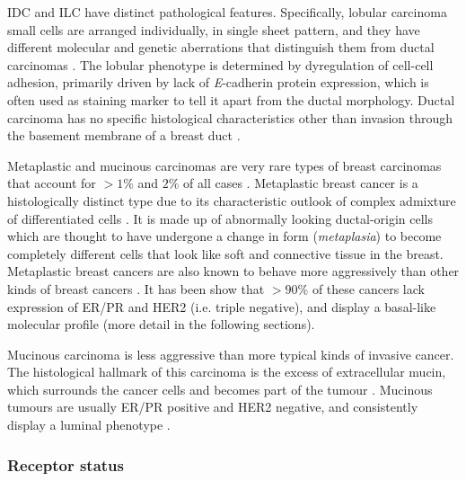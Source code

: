   IDC and ILC have distinct pathological features. Specifically, lobular carcinoma small cells are arranged individually, in single sheet pattern, and they have different molecular and genetic aberrations that distinguish them from ductal carcinomas \cite{weigelt2010molecular}. The lobular phenotype is determined by dyregulation of cell-cell adhesion, primarily driven by lack of \textit{E}-cadherin protein expression, which is often used as staining marker to tell it apart from the ductal morphology\cite{Ciriello2015ComprehensiveCancer, Abdelmessieh2016BreastOverview}. Ductal carcinoma has no specific histological characteristics other than invasion through the basement membrane of a breast duct \cite{Weigelt2008RefinementTypes}. 
   
    Metaplastic and mucinous carcinomas are very rare types of breast carcinomas that account for $>1\%$ and $2\%$ of all cases  \cite{Makki2015DiversityRelevance}. 
    Metaplastic breast cancer is a histologically distinct type due to its characteristic outlook of complex admixture of differentiated cells  \cite{Makki2015DiversityRelevance}. It is made up of abnormally looking ductal-origin cells which are thought to have undergone a change in form (\textit{metaplasia}) to become completely different cells that look like soft and connective tissue in the breast. Metaplastic breast cancers are also known to  behave more aggressively than other kinds of breast cancers \cite{schwartz2013metaplastic}. 
    It has been show that $>90\%$ of these cancers lack expression of ER/PR and HER2 (i.e. triple negative), and display a basal-like molecular profile \cite{Weigelt2010a} (more detail in the following sections).


    Mucinous carcinoma is less aggressive than more typical kinds of invasive cancer. The histological hallmark of this carcinoma is the excess of extracellular mucin, which surrounds the cancer cells and becomes part of the tumour \cite{dumitru2015mucinous}.  Mucinous tumours are usually ER/PR positive and HER2 negative, and consistently display a luminal phenotype \cite{Weigelt2010a}. 
    

   
   
   
   
   \subsubsection{Receptor status}
            
 
            
